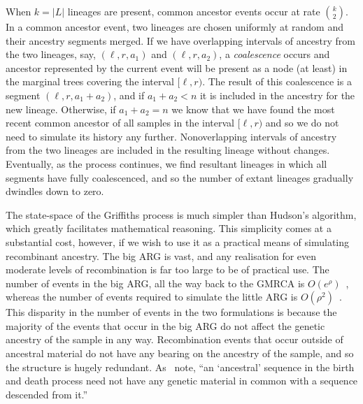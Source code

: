 \documentclass{article}
\begin{document}
When $k = |L|$ lineages are present, common ancestor events
occur at rate $\binom{k}{2}$. In a common ancestor event, two lineages
are chosen uniformly at random and their ancestry segments merged.
If we have overlapping intervals of ancestry from the two lineages,
say, $(\ell, r, a_1)$ and $(\ell, r, a_2)$, a
\emph{coalescence} occurs and ancestor represented by the current event
will be present as a node (at least) in the marginal trees covering
the interval $[\ell, r)$. The result of this coalescence is a segment
$(\ell, r, a_1 + a_2)$, and if $a_1 + a_2 < n$ it is included in the
ancestry for the new lineage. Otherwise, if $a_1 + a_2 = n$ we know that
we have found the most recent common ancestor of all samples in
the interval $[\ell, r)$ and so we do not need to simulate its history any further.
Nonoverlapping intervals of ancestry from the two lineages are included
in the resulting lineage without changes. Eventually, as the process continues,
we find resultant lineages in which all segments have fully coalescenced,
and so the number of extant lineages gradually dwindles down to zero.

The state-space of the Griffiths process is much simpler than Hudson's algorithm,
which greatly facilitates mathematical reasoning. This simplicity comes at a
substantial cost, however, if we wish to use it as a practical means of
simulating recombinant ancestry. The big ARG is vast, and any realisation
for even moderate levels of recombination is far too large to be of practical
use. The number of events in the big ARG, all the way back to the GMRCA
is $O(e^\rho)$~\citep{griffiths1997ancestral}, whereas the number
of events required to simulate the little ARG is
$O(\rho^2)$~\citep{hein2004gene,baumdicker2021efficient}.
This disparity in the number of events in the two formulations is
because the majority of the events that occur in the big ARG do
not affect the genetic ancestry of the sample in any way. Recombination
events that occur outside of ancestral material do not have any bearing
on the ancestry of the sample, and so the structure is hugely redundant.
As~\cite{wiuf1999recombination} note,
``an `ancestral' sequence in the birth and death process
need not have any genetic material in common with a
sequence descended from it.''
\end{document}

